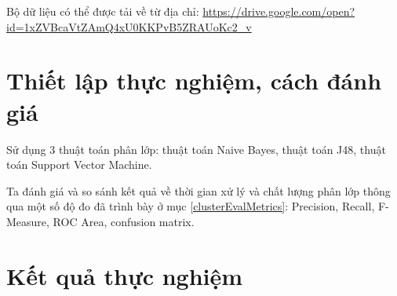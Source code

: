 Bộ dữ liệu có thể được tải về từ địa chỉ:
\url{https://drive.google.com/open?id=1xZVBcaVtZAmQ4xU0KKPvB5ZRAUoKc2_v}

\section{Thiết lập thực nghiệm, cách đánh giá}
Sử dụng 3 thuật toán phân lớp: thuật toán Naive Bayes, thuật toán J48, thuật toán Support Vector Machine. 

Ta đánh giá và so sánh kết quả về thời gian xử lý và chất lượng phân lớp thông qua một số độ đo đã trình bày ở mục \ref{clusterEvalMetrics}: Precision, Recall, F-Measure, ROC Area, confusion matrix.


\section{Kết quả thực nghiệm}

